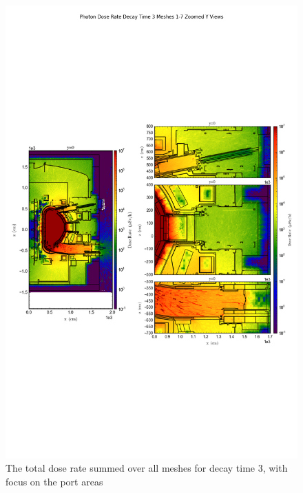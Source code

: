 \documentclass[12pt]{article}
\begin{document}
\begin{figure}[ht!]
\centering
\includegraphics[trim={0cm 9cm 0cm 10cm},clip,scale=0.75]{../plots/final_model_with_b4c/Photon_Dose_Rate_Decay_Time_3_Meshes_1-7_Zoomed_Y_Views.png}
\caption{The total dose rate summed over all meshes for decay time 3, with focus on the port areas}
\label{fig:photons_dc3_b4c_total_zoomed}
\end{figure}
\end{document}
